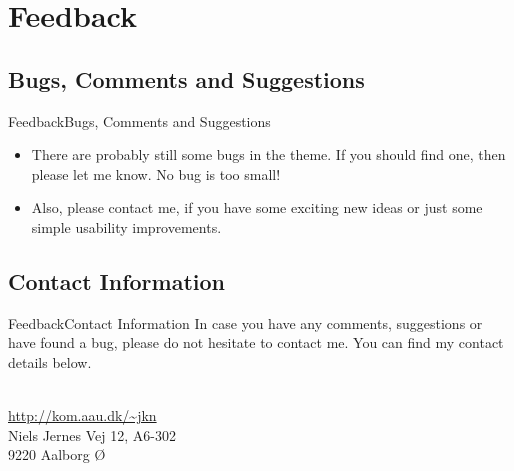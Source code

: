 \documentclass[10pt]{beamer}
\newcommand{\chref}[2]{%
  \href{#1}{{\usebeamercolor[bg]{Aalborg}#2}}
}
\begin{document}
\section{Feedback}
\subsection{Bugs, Comments and Suggestions}
\begin{frame}{Feedback}{Bugs, Comments and Suggestions}
  \begin{itemize}
    \item<1-> There are probably still some bugs in the theme. If you should find one, then please let me know. No bug is too small!
    \item<2-> Also, please contact me, if you have some exciting new ideas or just some simple usability improvements.
  \end{itemize}
\end{frame}

\subsection{Contact Information}
\begin{frame}{Feedback}{Contact Information}
In case you have any comments, suggestions or have found a bug, please do not hesitate to contact me. You can find my contact details below.
  \begin{center}
    \insertauthor\\
    \chref{http://kom.aau.dk/~jkn}{http://kom.aau.dk/\textasciitilde jkn}\\
    Niels Jernes Vej 12, A6-302\\
    9220 Aalborg Ø
  \end{center}
\end{frame}
\end{document}
